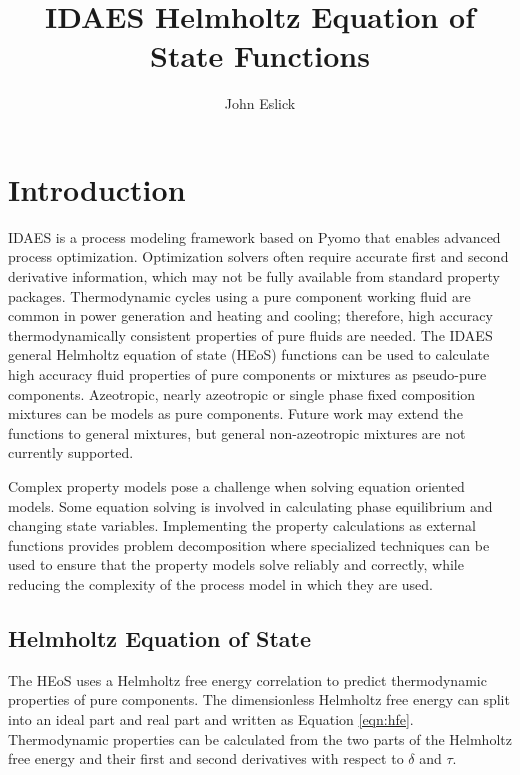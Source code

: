 \documentclass[oneside]{book}
\begin{document}

\renewcommand{\bibname}{References}

\title{IDAES Helmholtz Equation of State Functions}
\author{John Eslick}
\maketitle

\tableofcontents
\newpage

\chapter{Introduction}

IDAES \cite{lee2021} is a process modeling framework based on Pyomo \cite{bynum2021pyomo} that enables advanced process optimization. Optimization solvers often require accurate first and second derivative information, which may not be fully available from standard property packages. Thermodynamic cycles using a pure component working fluid are common in power generation and heating and cooling; therefore, high accuracy thermodynamically consistent properties of pure fluids are needed.  The IDAES general Helmholtz equation of state (HEoS) functions can be used to calculate high accuracy fluid properties of pure components or mixtures as pseudo-pure components.  Azeotropic, nearly azeotropic  or single phase fixed composition mixtures can be models as pure components. Future work may extend the functions to general mixtures, but general non-azeotropic mixtures are not currently supported.

Complex property models pose a challenge when solving equation oriented models. Some equation solving is involved in calculating phase equilibrium and changing state variables. Implementing the property calculations as external functions provides problem decomposition where specialized techniques can be used to ensure that the property models solve reliably and correctly, while reducing the complexity of the process model in which they are used.

\section{Helmholtz Equation of State}

The HEoS uses a Helmholtz free energy correlation to predict thermodynamic properties of pure components. The dimensionless Helmholtz free energy can split into an ideal part and real part and written as Equation \ref{eqn:hfe}. Thermodynamic properties can be calculated from the two parts of the Helmholtz free energy and their first and second derivatives with respect to $\delta$ and $\tau$.
\end{document}
